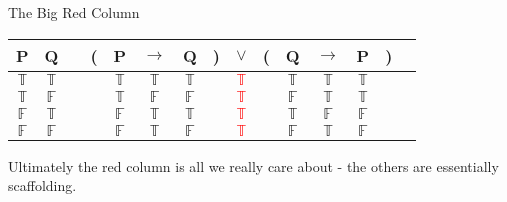 \documentclass[
  ignorenonframetext,
]{beamer}
\renewcommand{\,}{\text{, }}
\def\True{\mathbb{T}}
\def\False{\mathbb{F}}
\begin{document}
\begin{frame}{The Big Red Column}
\protect\hypertarget{the-big-red-column-1}{}

\begin{center}
\begin{tabular}{@{ }c@{ }@{ }c | c@{ }@{}c@{}@{ }c@{ }@{ }c@{ }@{ }c@{ }@{}c@{}@{ }c@{ }@{}c@{}@{ }c@{ }@{ }c@{ }@{ }c@{ }@{}c@{}@{ }c}
P & Q &  & ( & P & $\rightarrow$ & Q & ) & $\lor$ & ( & Q & $\rightarrow$ & P & ) & \\
\hline 
$\True$ & $\True$ &  &  & $\True$ & $\True$ & $\True$ &  & \textcolor{red}{$\True$} &  & $\True$ & $\True$ & $\True$ &  & \\
$\True$ & $\False$ &  &  & $\True$ & $\False$ & $\False$ &  & \textcolor{red}{$\True$} &  & $\False$ & $\True$ & $\True$ &  & \\
$\False$ & $\True$ &  &  & $\False$ & $\True$ & $\True$ &  & \textcolor{red}{$\True$} &  & $\True$ & $\False$ & $\False$ &  & \\
$\False$ & $\False$ &  &  & $\False$ & $\True$ & $\False$ &  & \textcolor{red}{$\True$} &  & $\False$ & $\True$ & $\False$ &  & \\
\end{tabular}
\bigskip
\end{center}

Ultimately the red column is all we really care about - the others are
essentially scaffolding.

\end{frame}
\end{document}
